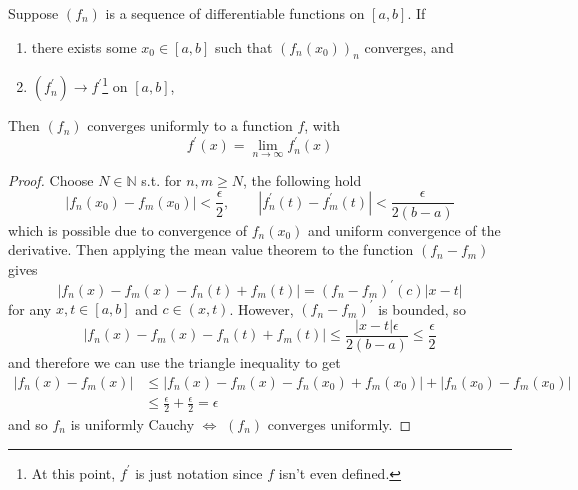   \begin{theorem}
    Suppose $(f_n)$ is a sequence of differentiable functions on $[a, b]$. If 
    \begin{enumerate}
      \item there exists some $x_0 \in [a, b]$ such that $(f_n (x_0))_n$ converges, and 
      \item $(f_n^\prime) \to f^\prime$\footnote{At this point, $f^\prime$ is just notation since $f$ isn't even defined.} on $[a, b]$, 
    \end{enumerate}
    Then $(f_n)$ converges uniformly to a function $f$, with 
    \begin{equation}
      f^\prime (x) = \lim_{n \to \infty} f_n^\prime (x) 
    \end{equation}
  \end{theorem} 
  \begin{proof}
    Choose $N \in \mathbb{N}$ s.t. for $n, m \geq N$, the following hold 
    \begin{equation}
      |f_n (x_0) - f_m (x_0)| < \frac{\epsilon}{2}, \qquad |f_n^\prime (t) - f_m^\prime (t)| < \frac{\epsilon}{2 (b - a)}
    \end{equation}
    which is possible due to convergence of $f_n (x_0)$ and uniform convergence of the derivative. Then applying the mean value theorem to the function $(f_n - f_m)$ gives 
    \begin{equation}
      |f_n (x) - f_m (x) - f_n (t) + f_m (t)| = (f_n - f_m)^\prime (c) |x - t| 
    \end{equation}
    for any $x, t \in [a, b]$ and $c \in (x, t)$. However, $(f_n - f_m)^\prime$ is bounded, so 
    \begin{equation}
      |f_n (x) - f_m (x) - f_n (t) + f_m (t)| \leq \frac{|x - t| \epsilon}{2 (b - a)} \leq \frac{\epsilon}{2}
    \end{equation}
    and therefore we can use the triangle inequality to get 
    \begin{align}
      |f_n (x) - f_m (x)| & \leq |f_n (x) - f_m (x) - f_n (x_0) + f_m (x_0)| + | f_n (x_0) - f_m (x_0)| \\
                          & \leq \frac{\epsilon}{2} + \frac{\epsilon}{2} = \epsilon
    \end{align}
    and so $f_n$ is uniformly Cauchy $\iff$ $(f_n)$ converges uniformly. 


\end{proof}
